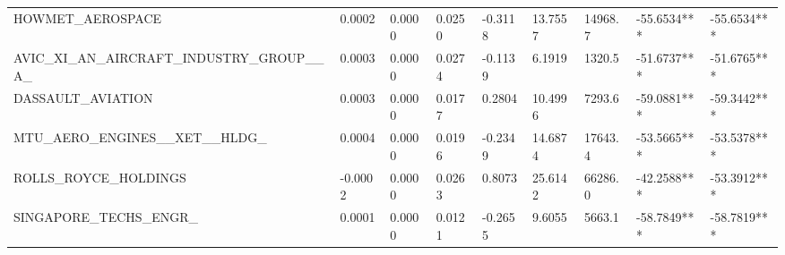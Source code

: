 \documentclass[
  number]{elsarticle}
\begin{document}
\begin{table}[H]
{\begin{tabular}[t]{lllllllll}
\addlinespace
HOWMET\_AEROSPACE & 0.0002 & 0.0000 & 0.0250 & -0.3118 & 13.7557 & 14968.7 & -55.6534*** & -55.6534***\\
AVIC\_XI\_AN\_AIRCRAFT\_INDUSTRY\_GROUP\_\_A\_ & 0.0003 & 0.0000 & 0.0274 & -0.1139 & 6.1919 & 1320.5 & -51.6737*** & -51.6765***\\
DASSAULT\_AVIATION & 0.0003 & 0.0000 & 0.0177 & 0.2804 & 10.4996 & 7293.6 & -59.0881*** & -59.3442***\\
MTU\_AERO\_ENGINES\_\_XET\_\_HLDG\_ & 0.0004 & 0.0000 & 0.0196 & -0.2349 & 14.6874 & 17643.4 & -53.5665*** & -53.5378***\\
ROLLS\_ROYCE\_HOLDINGS & -0.0002 & 0.0000 & 0.0263 & 0.8073 & 25.6142 & 66286.0 & -42.2588*** & -53.3912***\\
\addlinespace
SINGAPORE\_TECHS\_ENGR\_ & 0.0001 & 0.0000 & 0.0121 & -0.2655 & 9.6055 & 5663.1 & -58.7849*** & -58.7819***\\
\bottomrule
\end{tabular}}
\end{table}
\end{document}
